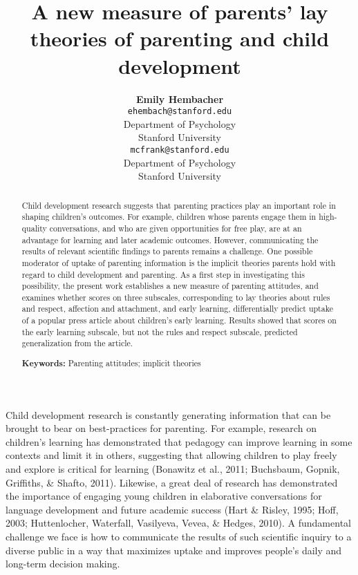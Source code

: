 \documentclass[10pt, letterpaper]{article}
\title{A new measure of parents' lay theories of parenting and child
development}
\author{{\large \bf Emily Hembacher} \\ \texttt{ehembach@stanford.edu} \\ Department of Psychology \\ Stanford University \And {\large \bf Michael C. Frank} \\ \texttt{mcfrank@stanford.edu} \\ Department of Psychology \\ Stanford University}
\begin{document}
\maketitle

\begin{abstract}
Child development research suggests that parenting practices play an
important role in shaping children's outcomes. For example, children
whose parents engage them in high-quality conversations, and who are
given opportunities for free play, are at an advantage for learning and
later academic outcomes. However, communicating the results of relevant
scientific findings to parents remains a challenge. One possible
moderator of uptake of parenting information is the implicit theories
parents hold with regard to child development and parenting. As a first
step in investigating this possibility, the present work establishes a
new measure of parenting attitudes, and examines whether scores on three
subscales, corresponding to lay theories about rules and respect,
affection and attachment, and early learning, differentially predict
uptake of a popular press article about children's early learning.
Results showed that scores on the early learning subscale, but not the
rules and respect subscale, predicted generalization from the article.

\textbf{Keywords:}
Parenting attitudes; implicit theories
\end{abstract}

Child development research is constantly generating information that can
be brought to bear on best-practices for parenting. For example,
research on children's learning has demonstrated that pedagogy can
improve learning in some contexts and limit it in others, suggesting
that allowing children to play freely and explore is critical for
learning (Bonawitz et al., 2011; Buchsbaum, Gopnik, Griffiths, \&
Shafto, 2011). Likewise, a great deal of research has demonstrated the
importance of engaging young children in elaborative conversations for
language development and future academic success (Hart \& Risley, 1995;
Hoff, 2003; Huttenlocher, Waterfall, Vasilyeva, Vevea, \& Hedges, 2010).
A fundamental challenge we face is how to communicate the results of
such scientific inquiry to a diverse public in a way that maximizes
uptake and improves people's daily and long-term decision making.
\end{document}
